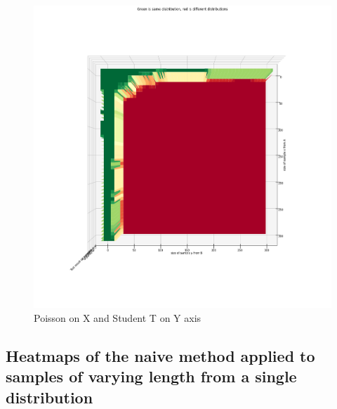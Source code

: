 \clearpage
\begin{figure}[htb]
  \centering
  \includegraphics[width=\linewidth]{./img/hypothesis_test/appendix/ks_X_poisson_Y_student_t_shuffled.png}
  \caption{Poisson on X and Student T on Y axis}
\end{figure}
\clearpage
\subsection{Heatmaps of the naive method applied to samples of varying length from a single distribution}

